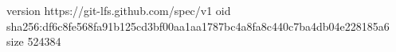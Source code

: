 version https://git-lfs.github.com/spec/v1
oid sha256:df6c8fe568fa91b125cd3bf00aa1aa1787bc4a8fa8c440c7ba4db04e228185a6
size 524384
